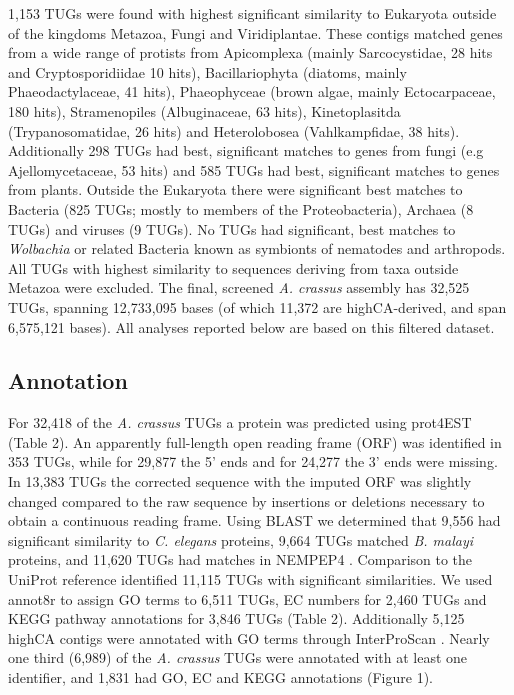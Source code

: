 \documentclass[10pt]{bmc_article}
\newenvironment{bmcformat}{\begin{raggedright}\baselineskip20pt\sloppy\setboolean{publ}{false}}{\end{raggedright}\baselineskip20pt\sloppy}
\begin{document}
\begin{bmcformat}
1,153 TUGs were found with highest significant similarity to Eukaryota
outside of the kingdoms Metazoa, Fungi and Viridiplantae. These
contigs matched genes from a wide range of protists from Apicomplexa
(mainly Sarcocystidae, 28 hits and Cryptosporidiidae 10 hits),
Bacillariophyta (diatoms, mainly Phaeodactylaceae, 41 hits),
Phaeophyceae (brown algae, mainly Ectocarpaceae, 180 hits),
Stramenopiles (Albuginaceae, 63 hits), Kinetoplasitda
(Trypanosomatidae, 26 hits) and Heterolobosea (Vahlkampfidae, 38
hits). Additionally 298 TUGs had best,
significant matches to genes from fungi (e.g Ajellomycetaceae, 53
hits) and 585 TUGs had best, significant matches to genes from
plants. Outside the Eukaryota there were significant best matches to
Bacteria (825 TUGs; mostly to members of the Proteobacteria), Archaea
(8 TUGs) and viruses (9 TUGs). No TUGs had significant, best matches
to \textit{Wolbachia} or related Bacteria known as symbionts of
nematodes and arthropods. All TUGs with highest similarity to
sequences deriving from taxa outside Metazoa were excluded. The final,
screened \textit{A. crassus} assembly has
32,525 TUGs, spanning
12,733,095
bases (of which 11,372 are
highCA-derived, and span
6,575,121
bases). All analyses reported below are based on this filtered
dataset.














\subsection*{Annotation}

For
32,418
of the \textit{A. crassus} TUGs a protein was predicted using prot4EST
\cite{wasmuth_prot4est:_2004} (Table 2). An apparently full-length
open reading frame (ORF) was identified in
353 TUGs,
while for 29,877
the 5' ends and for
24,277 the 3'
ends were missing. In 13,383 TUGs the
corrected sequence with the imputed ORF was slightly changed compared
to the raw sequence by insertions or deletions necessary to obtain a
continuous reading frame. Using BLAST we determined that
9,556
had significant similarity to \textit{C. elegans} proteins,
9,664
TUGs matched \textit{B. malayi} proteins, and
11,620
TUGs had matches in NEMPEP4 \cite{parkinson_nembase:resource_2004,
  pmid21550347}. Comparison to the UniProt reference identified
11,115
TUGs with significant similarities. We used annot8r
\cite{schmid_annot8r:_2008} to assign GO terms to 6,511
TUGs, EC numbers for 2,460 TUGs and KEGG pathway annotations
for 3,846 TUGs (Table 2). Additionally 5,125
highCA contigs were annotated with GO terms through InterProScan
\cite{pmid11590104}. Nearly one third (6,989) of
the \textit{A. crassus} TUGs were annotated with at least one
identifier, and 1,831 had GO, EC and KEGG
annotations (Figure 1).


\end{bmcformat}
\end{document}
